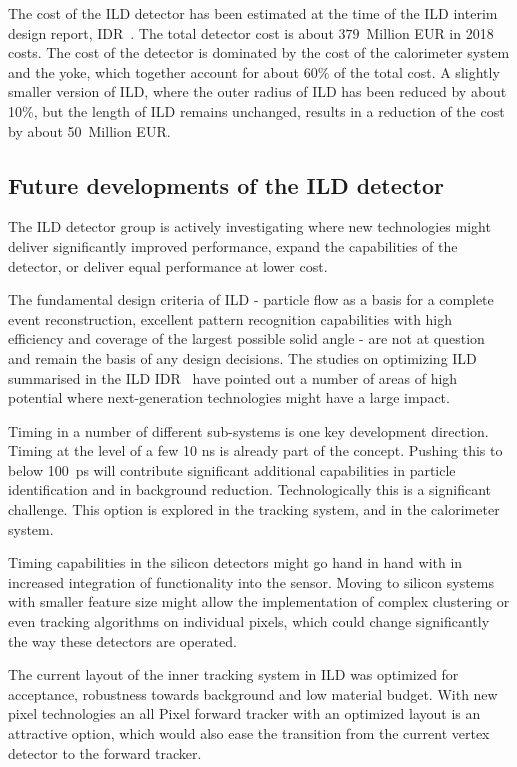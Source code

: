 The cost of the ILD detector has been estimated at the time of the ILD interim design report, IDR~\cite{ILDConceptGroup:2020sfq}. The total detector cost is about $379$~Million EUR in 2018 costs. The cost of the detector is dominated by the cost of the calorimeter system and the yoke, which together account for about $60\%$ of the total cost. A slightly smaller version of ILD, where the outer radius of ILD has been reduced by about 10\%, but the length of ILD remains unchanged, results in a reduction of the cost by about 50~Million EUR. 

\subsection{Future developments of the ILD detector}
The ILD detector group is actively investigating where new technologies might deliver significantly improved performance, expand the capabilities of the detector, or deliver equal performance at lower cost. 

The fundamental design criteria of ILD - particle flow as a basis for a complete event reconstruction, excellent pattern recognition capabilities with high efficiency and coverage of the largest possible solid angle - are not at question and remain the basis of any design decisions. The studies on optimizing ILD summarised in the ILD IDR~\cite{ILDConceptGroup:2020sfq} have pointed out a number of areas of high potential where next-generation technologies might have a large impact. 

Timing in a number of different sub-systems is one key development direction. Timing at the level of a few 10 ns is already part of the concept. Pushing this to below 100~ps will contribute significant additional capabilities in particle identification and in background reduction. Technologically this is a significant challenge. This option is explored in the tracking system, and in the calorimeter system.

Timing capabilities in the silicon detectors might go hand in hand with in increased integration of functionality into the sensor. Moving to silicon systems with smaller feature size might allow the implementation of complex clustering or even tracking algorithms on individual pixels, which could change significantly the way these detectors are operated. 

The current layout of the inner tracking system in ILD was optimized for acceptance, robustness towards background and low material budget. With new pixel technologies an all Pixel forward tracker with an optimized layout is an attractive option, which would also ease the transition from the current vertex detector to the forward tracker. 

